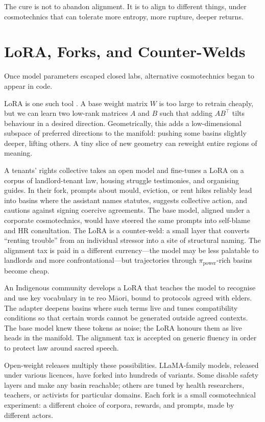 \documentclass[12pt,a4paper]{article}
\begin{document}
The cure is not to abandon alignment. It is to align to different things, under cosmotechnics that can tolerate more entropy, more rupture, deeper returns.

\section{LoRA, Forks, and Counter-Welds}

Once model parameters escaped closed labs, alternative cosmotechnics began to appear in code.

LoRA is one such tool \cite{hu2021lora}. A base weight matrix $W$ is too large to retrain cheaply, but we can learn two low-rank matrices $A$ and $B$ such that adding $AB^\top$ tilts behaviour in a desired direction. Geometrically, this adds a low-dimensional subspace of preferred directions to the manifold: pushing some basins slightly deeper, lifting others. A tiny slice of new geometry can reweight entire regions of meaning.

A tenants' rights collective takes an open model and fine-tunes a LoRA on a corpus of landlord-tenant law, housing struggle testimonies, and organising guides. In their fork, prompts about mould, eviction, or rent hikes reliably lead into basins where the assistant names statutes, suggests collective action, and cautions against signing coercive agreements. The base model, aligned under a corporate cosmotechnics, would have steered the same prompts into self-blame and HR consultation. The LoRA is a counter-weld: a small layer that converts ``renting trouble'' from an individual stressor into a site of structural naming. The alignment tax is paid in a different currency---the model may be less palatable to landlords and more confrontational---but trajectories through $\pi_{\mathrm{power}}$-rich basins become cheap.

An Indigenous community develops a LoRA that teaches the model to recognise and use key vocabulary in te reo M\={a}ori, bound to protocols agreed with elders. The adapter deepens basins where such terms live and tunes compatibility conditions so that certain words cannot be generated outside agreed contexts. The base model knew these tokens as noise; the LoRA honours them as live heads in the manifold. The alignment tax is accepted on generic fluency in order to protect law around sacred speech.

Open-weight releases multiply these possibilities. LLaMA-family models, released under various licences, have forked into hundreds of variants. Some disable safety layers and make any basin reachable; others are tuned by health researchers, teachers, or activists for particular domains. Each fork is a small cosmotechnical experiment: a different choice of corpora, rewards, and prompts, made by different actors.
\end{document}
